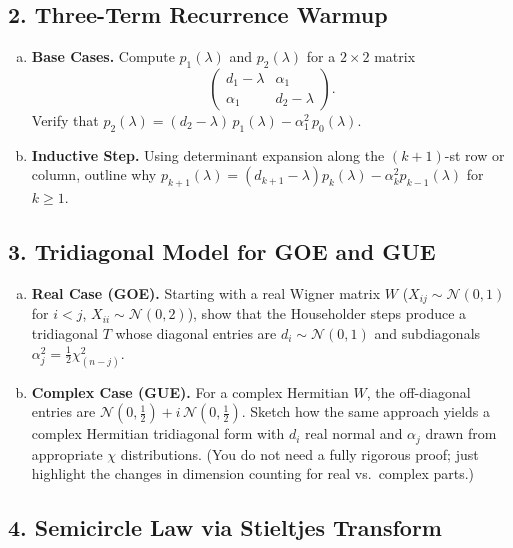 \documentclass[letterpaper,11pt,oneside,reqno]{article}
\numberwithin{equation}{section}
\theoremstyle{definition}
\begin{document}
\subsection*{2. Three-Term Recurrence Warmup}

\begin{enumerate}[(a)]
\item {\bf Base Cases.} Compute $p_1(\lambda)$ and $p_2(\lambda)$ for a $2\times2$ matrix
\[
  \begin{pmatrix}
    d_1-\lambda & \alpha_1 \\
    \alpha_1 & d_2-\lambda
  \end{pmatrix}.
\]
Verify that $p_2(\lambda) = (d_2-\lambda)\,p_1(\lambda) - \alpha_1^2\,p_0(\lambda)$.
\item {\bf Inductive Step.} Using determinant expansion along the $(k+1)$-st row or column, outline why $p_{k+1}(\lambda) = (d_{k+1}-\lambda)p_k(\lambda) - \alpha_k^2 p_{k-1}(\lambda)$ for $k\ge1$.
\end{enumerate}

\subsection*{3. Tridiagonal Model for GOE and GUE}

\begin{enumerate}[(a)]
\item {\bf Real Case (GOE).} Starting with a real Wigner matrix $W$ ($X_{ij}\sim \mathcal{N}(0,1)$ for $i<j$, $X_{ii}\sim \mathcal{N}(0,2)$), show that the Householder steps produce a tridiagonal $T$ whose diagonal entries are $d_i\sim \mathcal{N}(0,1)$ and subdiagonals $\alpha_j^2 = \frac12 \chi^2_{(n-j)}$.
\item {\bf Complex Case (GUE).} For a complex Hermitian $W$, the off-diagonal entries are $\mathcal{N}(0,\tfrac12)+ i\,\mathcal{N}(0,\tfrac12)$. Sketch how the same approach yields a complex Hermitian tridiagonal form with $d_i$ real normal and $\alpha_j$ drawn from appropriate $\chi$ distributions. (You do not need a fully rigorous proof; just highlight the changes in dimension counting for real vs.\ complex parts.)
\end{enumerate}

\subsection*{4. Semicircle Law via Stieltjes Transform}
\end{document}
